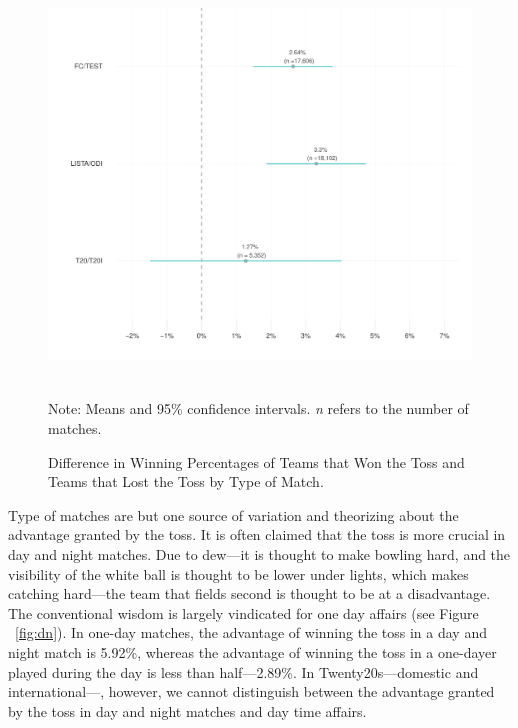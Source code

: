 \documentclass[12pt]{article}
\begin{document}
\begin{figure}[htbp]
\caption{Difference in Winning Percentages of Teams that Won the Toss and Teams that Lost the Toss by Type of Match.}
\centering
\includegraphics[scale=.85]{../figs/winbyType.pdf}
{\footnotesize \\ Note: Means and 95\% confidence intervals. \emph{n} refers to the number of matches.\par}
\label{fig:type}
\end{figure}

Type of matches are but one source of variation and theorizing about the advantage granted by the toss. It is often claimed that the toss is more crucial in day and night matches. Due to dew---it is thought to make bowling hard, and the visibility of the white ball is thought to be lower under lights, which makes catching hard---the team that fields second is thought to be at a disadvantage. The conventional wisdom is largely vindicated for one day affairs (see Figure ~\ref{fig:dn}). In one-day matches, the advantage of winning the toss in a day and night match is 5.92\%, whereas the advantage of winning the toss in a one-dayer played during the day is less than half---2.89\%. In Twenty20s---domestic and international---, however, we cannot distinguish between the advantage granted by the toss in day and night matches and day time affairs.
\end{document}
